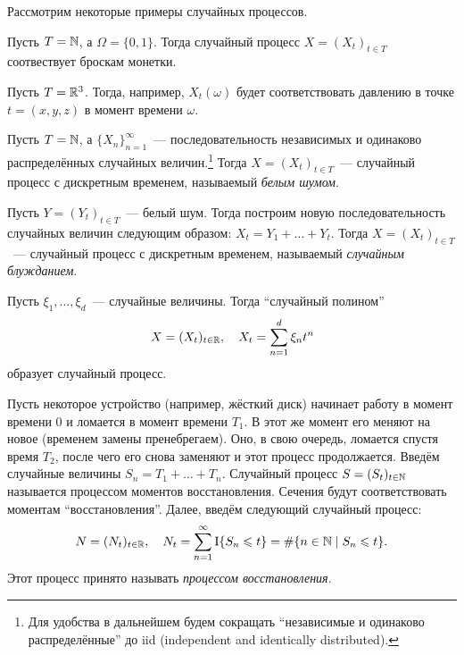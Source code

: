 Рассмотрим некоторые примеры случайных процессов.
\begin{example}
	Пусть \(T = \mathbb{N}\), а \(\Omega = \{0, 1\}\). Тогда случайный процесс \(X = 
	(X_t)_{t \in T}\) соотвествует броскам монетки.
\end{example}
\begin{example}
	Пусть \(T = \mathbb{R}^{3}\). Тогда, например, \(X_{t}(\omega)\) будет 
	соответствовать давлению в точке \(t = (x, y, z)\) в момент времени 
	\(\omega\).
\end{example}
\begin{example}
	Пусть \(T = \mathbb{N}\), а \(\{X_{n}\}_{n = 1}^{\infty}\)~--- последовательность 
	независимых и одинаково распределённых случайных величин.\footnote{Для 
	удобства в дальнейшем будем сокращать ``независимые и одинаково 
	распределённые'' до iid (independent and identically distributed).} Тогда 
	\(X = (X_t)_{t \in T}\)~--- случайный процесс с дискретным временем, 
	называемый \emph{белым шумом}. 
\end{example}
\begin{example}
	Пусть \(Y = (Y_t)_{t \in T}\)~--- белый шум. Тогда построим новую 
	последовательность случайных величин следующим образом: \(X_{t} = Y_{1} + 
	\ldots + Y_{t}\). Тогда \(X = (X_{t})_{t \in T}\)~--- случайный процесс с 
	дискретным временем, называемый \emph{случайным блужданием}. 
\end{example}
\begin{example}
	Пусть \(\xi_{1}, \ldots, \xi_{d}\)~--- случайные величины. Тогда 
	``случайный полином''
	\[
		X = (X_{t})_{t \in \mathbb{R}}, \quad X_t = \sum_{n = 1}^{d} \xi_{n}t^{n}
	\]
	образует случайный процесс.
\end{example}
\begin{example}
	Пусть некоторое устройство (например, жёсткий диск) начинает работу в 
	момент времени 0 и ломается в момент времени \(T_{1}\). В этот же момент 
	его меняют на новое (временем замены пренебрегаем). Оно, в свою очередь, 
	ломается спустя время \(T_{2}\), после чего его снова заменяют и этот 
	процесс продолжается. Введём случайные величины \(S_{n} = T_{1} + \dots + 
	T_{n}\). Случайный процесс \(S = (S_{t})_{t \in \mathbb{N}}\) называется процессом 
	моментов восстановления. Сечения будут соответствовать моментам 
	``восстановления''. Далее, введём следующий случайный процесс:
	\[
		N = (N_{t})_{t \in \mathbb{R}}, \quad N_{t} = \sum_{n = 1}^{\infty} 
		\operatorname{\mathrm{I}}\{S_{n} \leqslant t\} = \#\{n \in \mathbb{N} \mid S_{n} \leqslant t\}.
	\]
	Этот процесс принято называть \emph{процессом восстановления}.
\end{example}

